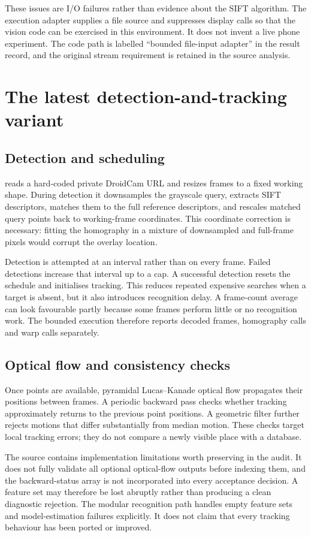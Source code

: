 These issues are I/O failures rather than evidence about the SIFT algorithm. The execution adapter supplies a file source and suppresses display calls so that the vision code can be exercised in this environment. It does not invent a live phone experiment. The code path is labelled ``bounded file-input adapter'' in the result record, and the original stream requirement is retained in the source analysis.

\section{The latest detection-and-tracking variant}
\subsection{Detection and scheduling}
 reads a hard-coded private DroidCam URL and resizes frames to a fixed working shape. During detection it downsamples the grayscale query, extracts SIFT descriptors, matches them to the full reference descriptors, and rescales matched query points back to working-frame coordinates. This coordinate correction is necessary: fitting the homography in a mixture of downsampled and full-frame pixels would corrupt the overlay location.

Detection is attempted at an interval rather than on every frame. Failed detections increase that interval up to a cap. A successful detection resets the schedule and initialises tracking. This reduces repeated expensive searches when a target is absent, but it also introduces recognition delay. A frame-count average can look favourable partly because some frames perform little or no recognition work. The bounded execution therefore reports decoded frames, homography calls and warp calls separately.

\subsection{Optical flow and consistency checks}
Once points are available, pyramidal Lucas--Kanade optical flow propagates their positions between frames. A periodic backward pass checks whether tracking approximately returns to the previous point positions. A geometric filter further rejects motions that differ substantially from median motion. These checks target local tracking errors; they do not compare a newly visible place with a database.

The source contains implementation limitations worth preserving in the audit. It does not fully validate all optional optical-flow outputs before indexing them, and the backward-status array is not incorporated into every acceptance decision. A feature set may therefore be lost abruptly rather than producing a clean diagnostic rejection. The modular recognition path handles empty feature sets and model-estimation failures explicitly. It does not claim that every tracking behaviour has been ported or improved.

